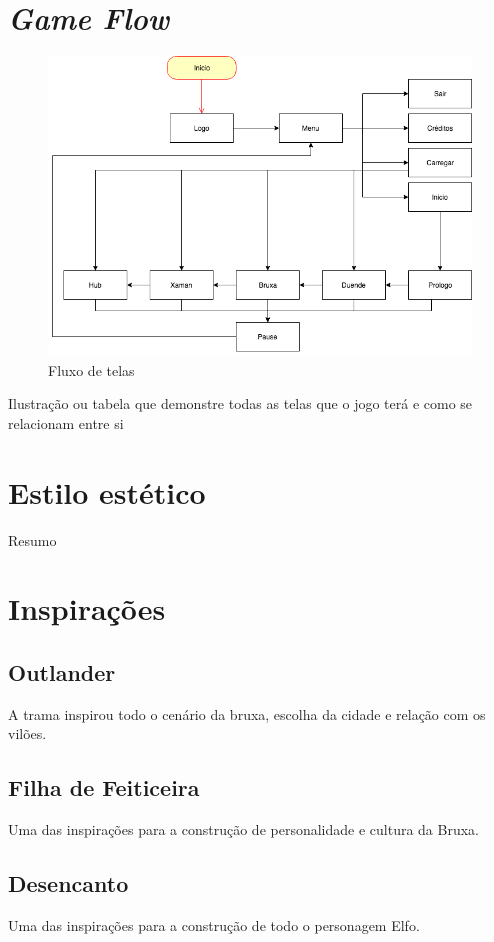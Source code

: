 \section{\textit{Game Flow}}
\begin{figure}[htb]
	\caption{\label{fig_grafico}Fluxo de telas}
	\begin{center}
	    \includegraphics[scale=0.5]{imagens/Flow.png}
	\end{center}
\end{figure}
Ilustração ou tabela que demonstre todas as telas que o jogo terá e como se relacionam entre si

\section{Estilo estético}

Resumo

\section{Inspirações}
\subsection{Outlander}
A trama inspirou todo o cenário da bruxa, escolha da cidade e relação com os vilões.
\subsection{Filha de Feiticeira}
Uma das inspirações para a construção de personalidade e cultura da Bruxa.
\subsection{Desencanto}
Uma das inspirações para a construção de todo o personagem Elfo.
